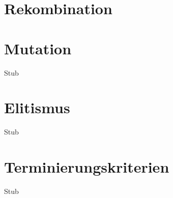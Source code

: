 \section{Rekombination}

\section{Mutation}
Stub

\section{Elitismus}
Stub

\section{Terminierungskriterien}
Stub






























